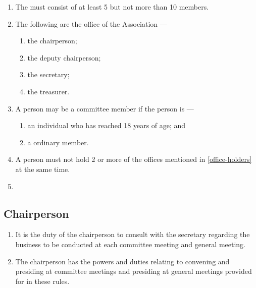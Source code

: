 \documentclass[../constitution.tex]{subfiles}
\begin{document}
\begin{enumerate}

\item \label{number-of-committee-members} The  must consist of at least 5 but not more than 10  members.
\item \label{office-holders} The following are the office  of the Association --- 

  \begin{enumerate}
  
  \item the chairperson;
  \item the deputy chairperson;
  \item the secretary;
  \item the treasurer.
  \end{enumerate}
\item A person may be a committee member if the person is --- \label{committee-eligibility}

  \begin{enumerate}
  
  \item an individual who has reached 18 years of age; and
  \item a ordinary member.
  \end{enumerate}
\item A person must not hold 2 or more of the offices mentioned in  \ref{office-holders} at the same time.
\item {} 
\end{enumerate}

\hypertarget{chairperson}{%
\subsection{Chairperson}\label{chairperson}}

\begin{enumerate}

\item It is the duty of the chairperson to consult with the secretary regarding the business to be conducted at each committee meeting and general meeting.
\item The chairperson has the powers and duties relating to convening and presiding at committee meetings and presiding at general meetings provided for in these rules.
\end{enumerate}
\end{document}
